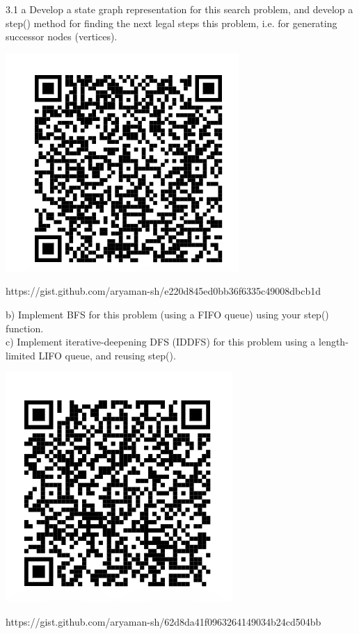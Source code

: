 \documentclass[11pt]{beamer}
\begin{document}
\begin{frame}{3.1 a}
Develop a state graph representation for this search problem, and develop a step() method for finding the next legal steps this problem, i.e. for generating successor nodes (vertices).\\
\begin{center} \pause
\includegraphics[scale=0.4]{envonly.png}
\end{center}
https://gist.github.com/aryaman-sh/e220d845ed0bb36f6335c49008dbcb1d
\end{frame}

\begin{frame}{3.1 }
b) Implement BFS for this problem (using a FIFO queue) using your step() function.
\\
\pause
c) Implement iterative-deepening DFS (IDDFS) for this problem using a length-limited LIFO queue, and reusing step().\\
\pause
\begin{center}
\includegraphics[scale=0.4]{31aqr.png}
\end{center}
https://gist.github.com/aryaman-sh/62d8da41f0963264149034b24cd504bb
\end{frame}
\end{document}
